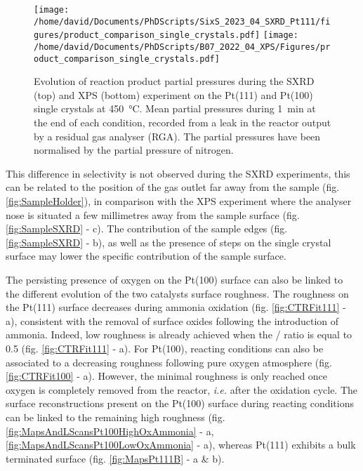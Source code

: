 \begin{figure}[!htb]
    \centering
    \texttt{[image: /home/david/Documents/PhDScripts/SixS\_2023\_04\_SXRD\_Pt111/figures/product\_comparison\_single\_crystals.pdf]}
    \texttt{[image: /home/david/Documents/PhDScripts/B07\_2022\_04\_XPS/Figures/product\_comparison\_single\_crystals.pdf]}
    \caption{
        Evolution of reaction product partial pressures during the SXRD (top) and XPS (bottom) experiment on the Pt(111) and Pt(100) single crystals at \qty{450}{\degreeCelsius}.
        Mean partial pressures during \qty{1}{\minute} at the end of each condition, recorded from a leak in the reactor output by a residual gas analyser (RGA).
        The partial pressures have been normalised by the partial pressure of nitrogen.
    }
    \label{fig:RGA450Pt111AndPt100}
\end{figure}

This difference in selectivity is not observed during the SXRD experiments, this can be related to the position of the gas outlet far away from the sample (fig. \ref{fig:SampleHolder}), in comparison with the XPS experiment where the analyser nose is situated a few millimetres away from the sample surface (fig. \ref{fig:SampleSXRD} - c).
The contribution of the sample edges (fig. \ref{fig:SampleSXRD} - b), as well as the presence of steps on the single crystal surface may lower the specific contribution of the sample surface.

The persisting presence of oxygen on the Pt(100) surface can also be linked to the different evolution of the two catalysts surface roughness.
The roughness on the Pt(111) surface decreases during ammonia oxidation (fig. \ref{fig:CTRFit111} - a), consistent with the removal of surface oxides following the introduction of ammonia.
Indeed, low roughness is already achieved when the / ratio is equal to \num{0.5} (fig. \ref{fig:CTRFit111} - a).
For Pt(100), reacting conditions can also be associated to a decreasing roughness following pure oxygen atmosphere (fig. \ref{fig:CTRFit100} - a).
However, the minimal roughness is only reached once oxygen is completely removed from the reactor, \textit{i.e.} after the oxidation cycle.
The surface reconstructions present on the Pt(100) surface during reacting conditions can be linked to the remaining high roughness (fig. \ref{fig:MapsAndLScansPt100HighOxAmmonia} - a, \ref{fig:MapsAndLScansPt100LowOxAmmonia} - a), whereas Pt(111) exhibits a bulk terminated surface (fig. \ref{fig:MapsPt111B} - a \& b).

